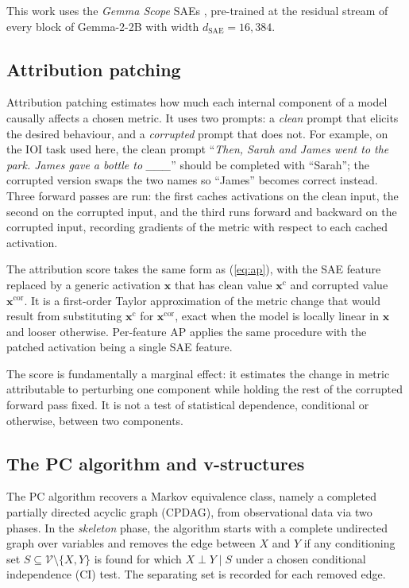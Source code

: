 \documentclass[conference]{IEEEtran}
\begin{document}
This work uses the \emph{Gemma Scope} SAEs \cite{lieberum2024}, pre-trained at the residual stream of every block of Gemma-2-2B with width $d_{\text{SAE}} = 16{,}384$.

\subsection{Attribution patching}\label{sec:apsub}
Attribution patching \cite{nanda2022, syed2023} estimates how much each internal component of a model causally affects a chosen metric. It uses two prompts: a \emph{clean} prompt that elicits the desired behaviour, and a \emph{corrupted} prompt that does not. For example, on the IOI task used here, the clean prompt ``\textit{Then, Sarah and James went to the park. James gave a bottle to \_\_\_}'' should be completed with ``Sarah''; the corrupted version swaps the two names so ``James'' becomes correct instead. Three forward passes are run: the first caches activations on the clean input, the second on the corrupted input, and the third runs forward and backward on the corrupted input, recording gradients of the metric with respect to each cached activation.

The attribution score takes the same form as (\ref{eq:ap}), with the SAE feature replaced by a generic activation $\mathbf{x}$ that has clean value $\mathbf{x}^{\text{c}}$ and corrupted value $\mathbf{x}^{\text{cor}}$. It is a first-order Taylor approximation of the metric change that would result from substituting $\mathbf{x}^{\text{c}}$ for $\mathbf{x}^{\text{cor}}$, exact when the model is locally linear in $\mathbf{x}$ and looser otherwise. Per-feature AP applies the same procedure with the patched activation being a single SAE feature.

The score is fundamentally a marginal effect: it estimates the change in metric attributable to perturbing one component while holding the rest of the corrupted forward pass fixed. It is not a test of statistical dependence, conditional or otherwise, between two components.

\subsection{The PC algorithm and v-structures}\label{sec:pcsub}
The PC algorithm \cite{spirtes1991} recovers a Markov equivalence class, namely a completed partially directed acyclic graph (CPDAG), from observational data via two phases. In the \emph{skeleton} phase, the algorithm starts with a complete undirected graph over variables and removes the edge between $X$ and $Y$ if any conditioning set $S \subseteq \mathcal{V} \setminus \{X, Y\}$ is found for which $X \perp Y \mid S$ under a chosen conditional independence (CI) test. The separating set is recorded for each removed edge.
\end{document}
